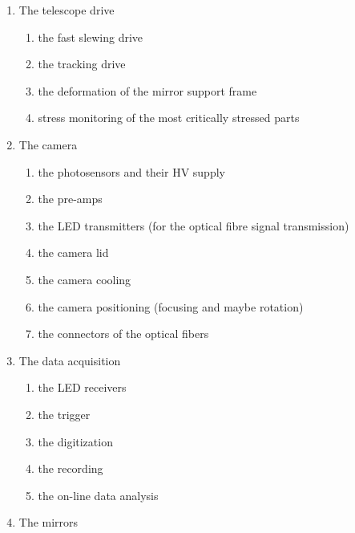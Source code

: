 \begin{enumerate}
\item  The telescope drive

\begin{enumerate}
\item  the fast slewing drive

\item  the tracking drive

\item the deformation of the mirror support frame

\item stress monitoring of the most critically stressed parts
\end{enumerate}

\item  The camera

\begin{enumerate}
\item  the photosensors and their HV supply

\item  the pre-amps

\item  the LED transmitters (for the optical fibre signal transmission)

\item  the camera lid

\item  the camera cooling

\item  the camera positioning (focusing and maybe rotation)
 
\item the connectors of the optical fibers
\end{enumerate}

\item  The data acquisition

\begin{enumerate}
\item  the LED receivers

\item  the trigger

\item  the digitization

\item  the recording

\item  the on-line data analysis
\end{enumerate}

\item  The mirrors


\end{enumerate}
